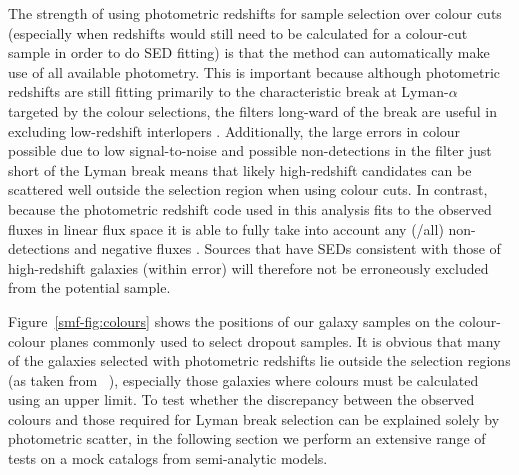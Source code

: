The strength of using photometric redshifts for sample selection over colour cuts (especially when redshifts would still need to be calculated for a colour-cut sample in order to do SED fitting) is that the method can automatically make use of all available photometry. This is important because although photometric redshifts are still fitting primarily to the characteristic break at Lyman-$\alpha$ targeted by the colour selections, the filters long-ward of the break are useful in excluding low-redshift interlopers \citep{2011MNRAS.418.2074M}. Additionally, the large errors in colour possible due to low signal-to-noise and possible non-detections in the filter just short of the Lyman break means that likely high-redshift candidates can be scattered well outside the selection region when using colour cuts. In contrast, because the photometric redshift code used in this analysis fits to the observed fluxes in linear flux space it is able to fully take into account any (/all) non-detections and negative fluxes \citep{Brammer:2008gn}. Sources that have SEDs consistent with those of high-redshift galaxies (within error) will therefore not be erroneously excluded from the potential sample.

Figure~\ref{smf-fig:colours} shows the positions of our galaxy samples on the colour-colour planes commonly used to select dropout samples. It is obvious that many of the galaxies selected with photometric redshifts lie outside the selection regions (as taken from \citeauthor{2007ApJ...670..928B}~\citeyear{2007ApJ...670..928B}), especially those galaxies where colours must be calculated using an upper limit. To test whether the discrepancy between the observed colours and those required for Lyman break selection can be explained solely by photometric scatter, in the following section we perform an extensive range of tests on a mock catalogs from semi-analytic models.



